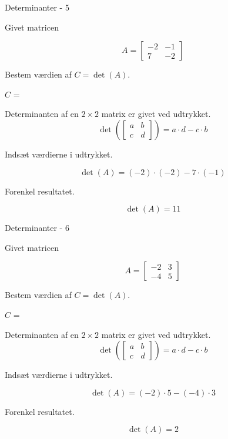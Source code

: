 \documentclass{article}
\begin{document}
\begin{exercise}{Determinanter - 5}

Givet matricen

\[
A = \left[\begin{array}{rr}
-2 & -1 \\
7 & -2
\end{array} \right]
\]

Bestem værdien af $C = \det(A)$.

$C$ = 

\hint
Determinanten af en $2 \times 2$ matrix er givet ved udtrykket.
\[
\det \left( \left[\begin{array}{rr}
a & b \\
c & d
\end{array} \right] \right) = a \cdot d - c \cdot b
\]

\hint
Indsæt værdierne i udtrykket.

\hint
\[
\det \left( A \right) = (-2) \cdot (-2) - 7 \cdot (-1)
\]

\hint
Forenkel resultatet.

\hint
\[
\det \left( A \right) = 11
\]


\end{exercise}


\begin{exercise}{Determinanter - 6}

Givet matricen

\[
A = \left[\begin{array}{rr}
-2 & 3 \\
-4 & 5
\end{array} \right]
\]

Bestem værdien af $C = \det(A)$.

$C$ = 

\hint
Determinanten af en $2 \times 2$ matrix er givet ved udtrykket.
\[
\det \left( \left[\begin{array}{rr}
a & b \\
c & d
\end{array} \right] \right) = a \cdot d - c \cdot b
\]

\hint
Indsæt værdierne i udtrykket.

\hint
\[
\det \left( A \right) = (-2) \cdot 5 - (-4) \cdot 3
\]

\hint
Forenkel resultatet.

\hint
\[
\det \left( A \right) = 2
\]

\end{exercise}
\end{document}
